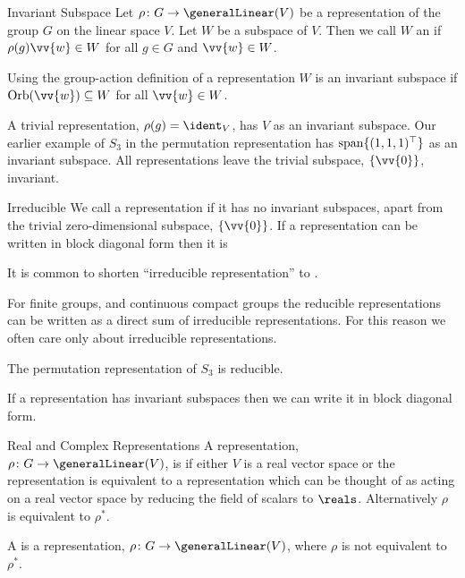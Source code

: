 \begin{dfn}{Invariant Subspace}{}
    Let \(\rho \colon G \to \generalLinear(V)\) be a representation of the
    group \(G\) on the linear space \(V\).
    Let \(W\) be a subspace of \(V\).
    Then we call \(W\) an  if
    \(\rho(g)\vv{w} \in W\) for all \(g \in G\) and \(\vv{w} \in W\).
    
    Using the group-action definition of a representation \(W\) is an
    invariant subspace if \(\Orb(\vv{w}) \subseteq W\) for all \(\vv{w} \in W\).
\end{dfn}

A trivial representation, \(\rho(g) = \ident_V\), has \(V\) as an invariant
subspace.
Our earlier example of \(S_3\) in the permutation representation has
\(\operatorname{span}\{(1, 1, 1)^\top\}\) as an invariant subspace.
All representations leave the trivial subspace, \(\{\vv{0}\}\), invariant.

\begin{dfn}{Irreducible}{}
    We call a representation  if it has no invariant subspaces, apart from the trivial
    zero-dimensional subspace, \(\{\vv{0}\}\).
    If a representation can be written in block diagonal form then it is
\end{dfn}

It is common to shorten \enquote{irreducible representation} to
.

For finite groups, and continuous compact groups the reducible
representations can be written as a direct sum of irreducible representations.
For this reason we often care only about irreducible representations.

The permutation representation of \(S_3\) is reducible.

\begin{lma}{}{}
    If a representation has invariant subspaces then we can write it in
    block diagonal form.
\end{lma}

\begin{dfn}{Real and Complex Representations}{}
    A representation, \(\rho \colon G \to \generalLinear(V)\), is
     if either \(V\) is a real vector space
    or the representation is equivalent to a representation which can be thought of
    as acting on a real vector space by reducing the field of scalars to \(\reals\).
    Alternatively \(\rho\) is equivalent to \(\rho^*\).
    
    A  is a representation, \(\rho
    \colon G \to \generalLinear(V)\), where \(\rho\) is not equivalent to
    \(\rho^*\).
\end{dfn}

